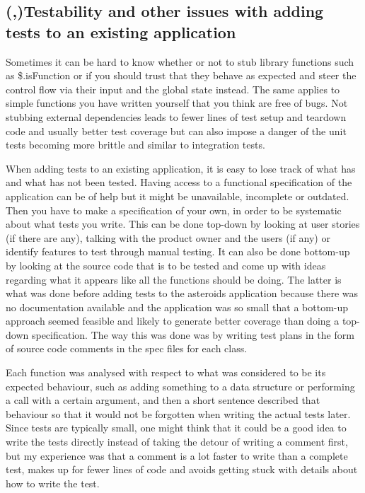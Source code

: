 \documentclass[11pt]{article}
\begin{document}
\subsection{(,)Testability and other issues with adding tests to an existing application}

Sometimes it can be hard to know whether or not to stub library functions such as \$.isFunction or if you should trust that they behave as expected and steer the control flow via their input and the global state instead. The same applies to simple functions you have written yourself that you think are free of bugs. Not stubbing external dependencies leads to fewer lines of test setup and teardown code and usually better test coverage but can also impose a danger of the unit tests becoming more brittle and similar to integration tests.

When adding tests to an existing application, it is easy to lose track of what has and what has not been tested. Having access to a functional specification of the application can be of help but it might be unavailable, incomplete or outdated. Then you have to make a specification of your own, in order to be systematic about what tests you write. This can be done top-down by looking at user stories (if there are any), talking with the product owner and the users (if any) or identify features to test through manual testing. It can also be done bottom-up by looking at the source code that is to be tested and come up with ideas regarding what it appears like all the functions should be doing. The latter is what was done before adding tests to the asteroids application because there was no documentation available and the application was so small that a bottom-up approach seemed feasible and likely to generate better coverage than doing a top-down specification. The way this was done was by writing test plans in the form of source code comments in the spec files for each class.

Each function was analysed with respect to what was considered to be its expected behaviour, such as adding something to a data structure or performing a call with a certain argument, and then a short sentence described that behaviour so that it would not be forgotten when writing the actual tests later. Since tests are typically small, one might think that it could be a good idea to write the tests directly instead of taking the detour of writing a comment first, but my experience was that a comment is a lot faster to write than a complete test, makes up for fewer lines of code and avoids getting stuck with details about how to write the test.
\end{document}
